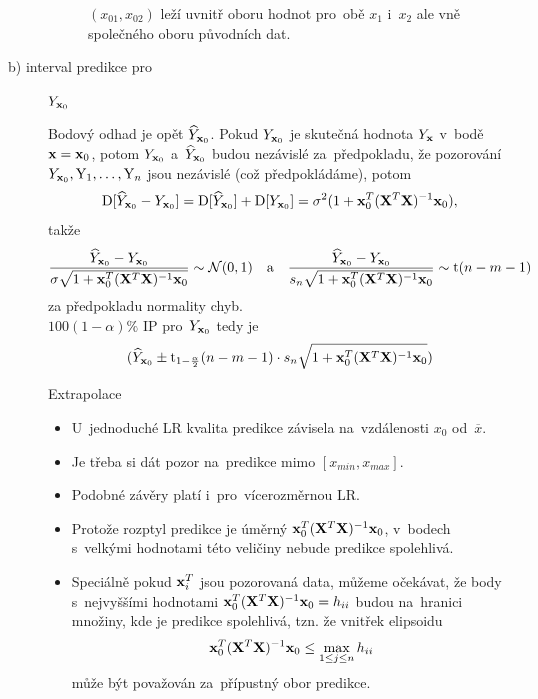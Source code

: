 \begin{description}
\begin{figure}[h]
	\caption{ $(x_{01},x_{02})$ leží uvnitř oboru hodnot pro~obě $x_1$ i~$x_2$ ale vně společného oboru původních dat.}
\end{figure}
\item[b) interval predikce pro] $Y_{\mathbf{x}_0}$

Bodový odhad je opět $\widehat{Y}_{\mathbf{x}_0}$. Pokud $Y_{\mathbf{x}_0}$ je skutečná hodnota $Y_{\mathbf{x}}$ v~bodě $\mathbf{x} = \mathbf{x}_0$, potom $Y_{\mathbf{x}_0}$ a~$\widehat{Y}_{\mathbf{x}_0}$ budou nezávislé za~předpokladu, že pozorování $Y_{\mathbf{x}_0}, \text{Y}_1,\dots, \text{Y}_n$ jsou nezávislé (což předpokládáme),
potom
 $$
\mathrm{D} [\widehat{Y}_{\mathbf{x}_0} - Y_{\mathbf{x}_0}] = \mathrm{D} [\widehat{Y}_{\mathbf{x}_0}] + \mathrm{D} [Y_{\mathbf{x}_0}] = \sigma^2(1+ \mathbf{x}_0^T(\mathbf{X}^T \mathbf{X})^{-1} \mathbf{x}_0),
 $$
takže
 $$
\frac{\widehat{Y}_{\mathbf{x}_0} - Y_{\mathbf{x}_0}}{\sigma \sqrt{1+ \mathbf{x}_0^T(\mathbf{X}^T \mathbf{X})^{-1} \mathbf{x}_0 }} \sim \mathcal{N}(0,1) \quad \text{a} \quad \frac{\widehat{Y}_{\mathbf{x}_0} - Y_{\mathbf{x}_0}}{s_n \sqrt{1+ \mathbf{x}_0^T(\mathbf{X}^T \mathbf{X})^{-1} \mathbf{x}_0 }} \sim \mathrm{t}(n-m-1)
 $$
za předpokladu normality chyb. \\
 $100(1-\alpha) \%$ IP pro~$Y_{\mathbf{x}_0}$ tedy je
 $$
 (\widehat{Y}_{\mathbf{x}_0} \pm \mathrm{t}_{1 - \frac{\alpha}{2}}(n-m-1) \cdot s_n \sqrt{1+ \mathbf{x}_0^T(\mathbf{X}^T \mathbf{X})^{-1} \mathbf{x}_0 })
 $$

	\begin{remark}
		Extrapolace
		
	    \begin{itemize}
	    \item U~jednoduché LR kvalita predikce závisela na~vzdálenosti $x_0$ od~$\overline{x}$.
	    \item Je třeba si dát pozor na~predikce mimo $[x_{min},x_{max}]$.
	    \item Podobné závěry platí i~pro~vícerozměrnou LR.
	    \item Protože rozptyl predikce je úměrný $\mathbf{x}_0^T(\mathbf{X}^T \mathbf{X})^{-1} \mathbf{x}_0$, v~bodech s~velkými hodnotami této veličiny nebude predikce spolehlivá.
	    \item Speciálně pokud $\mathbf{x}_i^T$ jsou pozorovaná data, můžeme očekávat, že body s~nejvyššími hodnotami $\mathbf{x}_0^T(\mathbf{X}^T \mathbf{X})^{-1} \mathbf{x}_0 = h_{ii}$ budou na~hranici množiny, kde je predikce spolehlivá, tzn. že vnitřek elipsoidu
	 $$
	       \mathbf{x}_0^T(\mathbf{X}^T \mathbf{X})^{-1} \mathbf{x}_0 \leq     \max_{1 \leq j \leq n} h_{ii}
	 $$
	    může být považován za~přípustný obor predikce.

\end{itemize}
\end{remark}
\end{description}
